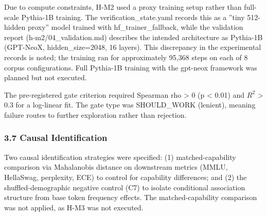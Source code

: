 Due to compute constraints, H-M2 used a proxy training setup rather than full-scale Pythia-1B training. The verification\_state.yaml records this as a ''tiny 512-hidden proxy'' model trained with hf\_trainer\_fallback, while the validation report (h-m2/04\_validation.md) describes the intended architecture as Pythia-1B (GPT-NeoX, hidden\_size=2048, 16 layers). This discrepancy in the experimental records is noted; the training ran for approximately 95,368 steps on each of 8 corpus configurations. Full Pythia-1B training with the gpt-neox framework was planned but not executed.

The pre-registered gate criterion required Spearman rho > 0 (p < 0.01) and $R^2$ > 0.3 for a log-linear fit. The gate type was SHOULD\_WORK (lenient), meaning failure routes to further exploration rather than rejection.

\subsubsection{3.7 Causal Identification}

Two causal identification strategies were specified: (1) matched-capability comparison via Mahalanobis distance on downstream metrics (MMLU, HellaSwag, perplexity, ECE) to control for capability differences; and (2) the shuffled-demographic negative control (C7) to isolate conditional association structure from base token frequency effects. The matched-capability comparison was not applied, as H-M3 was not executed.

